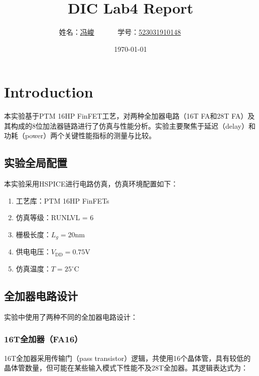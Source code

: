 \documentclass[UTF8,12pt,a4paper]{ctexart}
\title{DIC Lab4 Report}
\author{
	姓名：\underline{冯峻}~~~~~~
	学号：\underline{523031910148}~~~~~~}
\date{\today}
\begin{document}
\fancyfoot[C]{\thepage}

\maketitle
\tableofcontents
\newpage

\section{Introduction}

本实验基于PTM 16HP FinFET工艺，对两种全加器电路（16T FA和28T FA）及其构成的8位加法器链路进行了仿真与性能分析。实验主要聚焦于延迟（delay）和功耗（power）两个关键性能指标的测量与比较。

\subsection{实验全局配置}

本实验采用HSPICE进行电路仿真，仿真环境配置如下：

\begin{enumerate}
    \item 工艺库：PTM 16HP FinFETs
    \item 仿真等级：RUNLVL = 6
    \item 栅极长度：$L_g = 20$nm
    \item 供电电压：$V_{\text{DD}} = 0.75$V
    \item 仿真温度：$T = 25^\circ\mathrm{C}$
\end{enumerate}

\subsection{全加器电路设计}

实验中使用了两种不同的全加器电路设计：

\subsubsection{16T全加器（FA16）}

16T全加器采用传输门（pass transistor）逻辑，共使用16个晶体管，具有较低的晶体管数量，但可能在某些输入模式下性能不及28T全加器。其逻辑表达式为：
\end{document}
